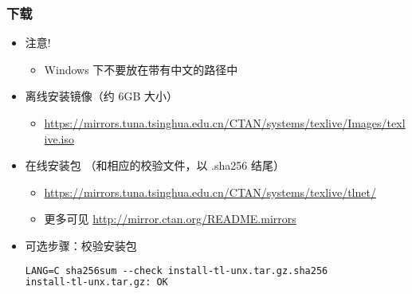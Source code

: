\begin{frame}[fragile]
  \frametitle{下载 \TL}
  \begin{itemize}
    \item 注意!
      \begin{itemize}
        \item Windows 下不要放在带有中文的路径中
      \end{itemize}
    \item 离线安装镜像（约 6GB 大小）
      \begin{itemize}
        \item {\footnotesize
          \url{https://mirrors.tuna.tsinghua.edu.cn/CTAN/systems/texlive/Images/texlive.iso}}
      \end{itemize}
    \item 在线安装包 （和相应的校验文件，以 .sha256 结尾）
      \begin{itemize} %
        \item {\footnotesize
          \url{https://mirrors.tuna.tsinghua.edu.cn/CTAN/systems/texlive/tlnet/}
        }
        \item 更多可见 \url{http://mirror.ctan.org/README.mirrors}
      \end{itemize}

    \item 可选步骤：校验安装包
      \begin{lstlisting}[language=tex]
LANG=C sha256sum --check install-tl-unx.tar.gz.sha256
install-tl-unx.tar.gz: OK
      \end{lstlisting}

  \end{itemize}
\end{frame}


